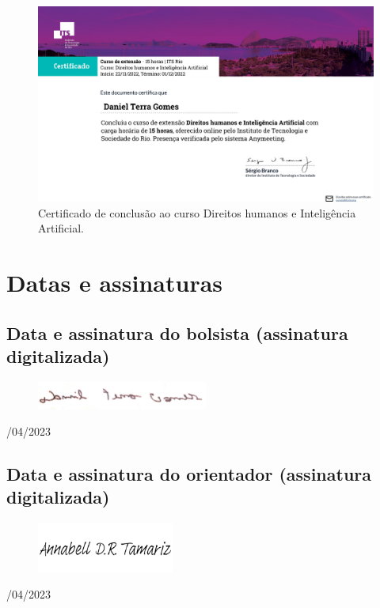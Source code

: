 \begin{figure}[H]
\centering
    \includegraphics[width=\textwidth]{Figures/its1.pdf}
\caption{Certificado de conclusão ao curso Direitos humanos e Inteligência Artificial.}
\label{Design}
\end{figure}



\chapter{Datas e assinaturas} \label{ass}

\section{Data e assinatura do bolsista (assinatura digitalizada)}


\begin{figure}[H]
 \centering
 \includegraphics[width=0.5\textwidth]{Figures/sign.png}
\end{figure}
/04/2023

\section{Data e assinatura do orientador (assinatura digitalizada)}


\begin{figure}[H]
 \centering
 \includegraphics[width=0.4\textwidth]{Figures/assinatura_annabell.png}
\end{figure}
/04/2023

